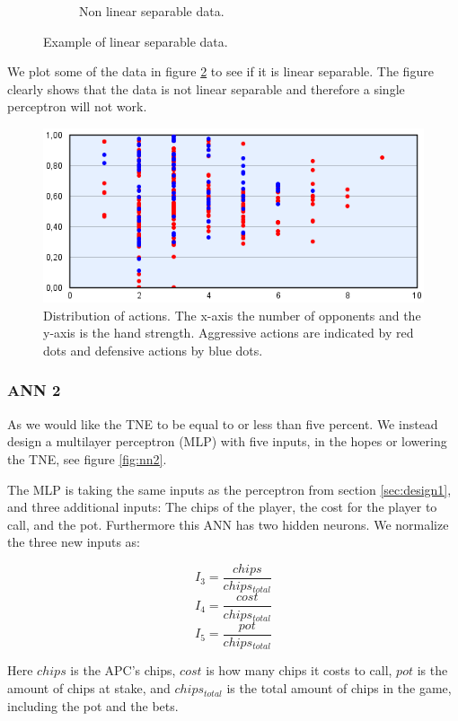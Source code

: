 \begin{centering}
\begin{figure}
\begin{subfigure}[b]{0.4\textwidth}
    \caption{Non linear separable data.}
  \end{subfigure}
  \caption{Example of linear separable data.\label{fig:ls-example}}
\end{figure}
\end{centering}

We plot some of the data in figure \ref{fig:linear-separable} to see if it is linear separable.  The figure clearly shows that the data is not linear separable and therefore a single perceptron will not work.


\begin{figure}[H]
  \center
    \includegraphics[scale=0.8]{images/nn/default-nn1-plot.png}
  \caption{Distribution of actions. The x-axis  the number of opponents and the y-axis is the hand strength. Aggressive actions are indicated by red dots and defensive actions by blue dots. \label{fig:linear-separable}}
\end{figure}

\subsubsection{ANN 2}
\label{sec:design2}
As we would like the TNE to be equal to or less than five percent. We instead design a multilayer perceptron (MLP) with five inputs, in the hopes or lowering the TNE, see figure \ref{fig:nn2}.

The MLP is taking the same inputs as the perceptron from section \ref{sec:design1}, and three additional inputs: The chips of the player, the cost for the player to call, and the pot. Furthermore this ANN has two hidden neurons. We normalize the three new inputs as: 

\[I_{3} = \frac{chips}{chips_{total}}\] 
\[I_{4} = \frac{cost}{chips_{total}}\]
\[I_{5} = \frac{pot}{chips_{total}}\]

Here $chips$ is the APC's chips, $cost$ is how many chips it costs to call, $pot$ is the amount of chips at stake, and $chips_{total}$ is the total amount of chips in the game, including the pot and the bets.


